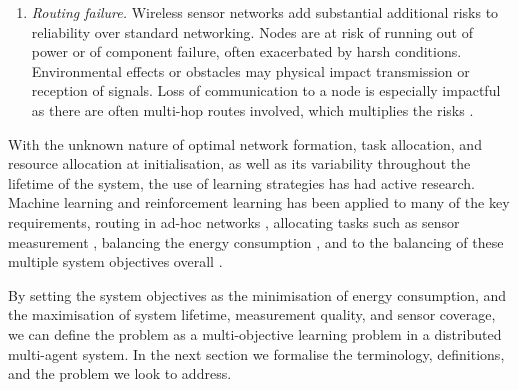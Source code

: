 \begin{enumerate}
\item \textit{Routing failure.} Wireless sensor networks add substantial additional risks to reliability over standard networking. Nodes are at risk of running out of power or of component failure, often exacerbated by harsh conditions. Environmental effects or obstacles may physical impact transmission or reception of signals. Loss of communication to a node is especially impactful as there are often multi-hop routes involved, which multiplies the risks \citep{Paradis2007}.
\end{enumerate}

\ifdefined\DEBUG {} \else \fi
With the unknown nature of optimal network formation, task allocation, and resource allocation at initialisation, as well as its variability throughout the lifetime of the system, the use of learning strategies has had active research. Machine learning and reinforcement learning has been applied to many of the key requirements, routing in ad-hoc networks \citep{Nurmi}, allocating tasks such as sensor measurement \citep{doi:10.1155/2014/765182}, balancing the energy consumption \citep{10.1007/978-3-642-11814-2_4, PraveenKumar2019a}, and to the balancing of these multiple system objectives overall \citep{SENGUPTA2013405, s150717572}.

\ifdefined\DEBUG {} \else \fi
By setting the system objectives as the minimisation of energy consumption, and the maximisation of system lifetime, measurement quality, and sensor coverage, we can define the problem as a multi-objective learning problem in a distributed multi-agent system. In the next section we formalise the terminology, definitions, and the problem we look to address.


